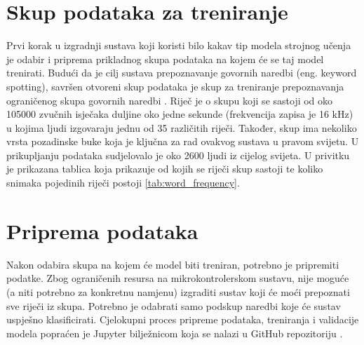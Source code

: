 \section{Skup podataka za treniranje}
\label{sec:dataset}

Prvi korak u izgradnji sustava koji koristi bilo kakav tip modela strojnog učenja
je odabir i priprema prikladnog skupa podataka na kojem će se taj model trenirati.
Budući da je cilj sustava prepoznavanje govornih naredbi (eng. keyword spotting),
savršen otvoreni skup podataka je skup za treniranje prepoznavanja ograničenog
skupa govornih naredbi \cite{speechcommandsv2}. Riječ je o skupu koji
se sastoji od oko 105000 zvučnih isječaka duljine oko jedne sekunde (frekvencija
zapisa je 16 kHz) u kojima ljudi
izgovaraju jednu od 35 različitih riječi. Također, skup ima nekoliko vrsta 
pozadinske buke koja je ključna za rad ovakvog sustava u pravom svijetu. 
U prikupljanju podataka sudjelovalo je oko 2600 ljudi iz cijelog svijeta.
U privitku je prikazana tablica koja prikazuje od kojih se riječi skup sastoji
te koliko snimaka pojedinih riječi postoji \ref{tab:word_frequency}.


\section{Priprema podataka}
\label{sec:data}

Nakon odabira skupa na kojem će model biti treniran, potrebno je pripremiti
podatke. Zbog ograničenih resursa na mikrokontrolerskom sustavu, nije moguće
(a niti potrebno za konkretnu namjenu) izgraditi sustav koji će moći
prepoznati sve riječi iz skupa. Potrebno je odabrati samo podskup
naredbi koje će sustav uspješno klasificirati. Cjelokupni
proces pripreme podataka, treniranja i validacije modela popraćen je
Jupyter bilježnicom koja se nalazi u GitHub repozitoriju
\cite{balic_keyword_spotting}.

